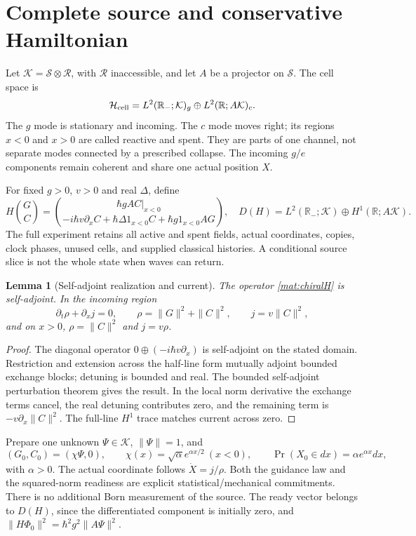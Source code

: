 \documentclass[11pt,oneside,openany]{book}
\newtheorem{lemma}[theorem]{Lemma}
\theoremstyle{definition}
\theoremstyle{remark}\newtheorem{remark}[theorem]{Remark}
\begin{document}
\section{Complete source and conservative Hamiltonian}

Let $\mathcal K=\mathcal S\otimes\mathcal R$, with $\mathcal R$ inaccessible, and let $A$ be a projector on $\mathcal S$. The cell space is
\begin{equation}
 \mathcal H_{\rm cell}=L^2(\mathbb R_-;\mathcal K)_g
            \oplus L^2(\mathbb R;A\mathcal K)_c.
 \label{mat:chiralspace}
\end{equation}
The $g$ mode is stationary and incoming. The $c$ mode moves right; its regions $x<0$ and $x>0$ are called reactive and spent. They are parts of one channel, not separate modes connected by a prescribed collapse. The incoming $g/e$ components remain coherent and share one actual position $X$.

For fixed $g>0$, $v>0$ and real $\Delta$, define
\begin{equation}
 H\binom GC=
 \binom{\hbar g A C|_{x<0}}
 {-i\hbar v\partial_x C+\hbar\Delta1_{x<0}C+\hbar g1_{x<0}AG},
 \quad D(H)=L^2(\mathbb R_-;\mathcal K)\oplus H^1(\mathbb R;A\mathcal K).
 \label{mat:chiralH}
\end{equation}
The full experiment retains all active and spent fields, actual coordinates, copies, clock phases, unused cells, and supplied classical histories. A conditional source slice is not the whole state when waves can return.

\begin{lemma}[Self-adjoint realization and current]
\label{mat:selfadjoint}
The operator \eqref{mat:chiralH} is self-adjoint. In the incoming region
\[
 \partial_t\rho+\partial_xj=0,
 \qquad\rho=\|G\|^2+\|C\|^2,\qquad j=v\|C\|^2,
\]
and on $x>0$, $\rho=\|C\|^2$ and $j=v\rho$.
\end{lemma}
\begin{proof}
The diagonal operator $0\oplus(-i\hbar v\partial_x)$ is self-adjoint on the stated domain. Restriction and extension across the half-line form mutually adjoint bounded exchange blocks; detuning is bounded and real. The bounded self-adjoint perturbation theorem gives the result. In the local norm derivative the exchange terms cancel, the real detuning contributes zero, and the remaining term is $-v\partial_x\|C\|^2$. The full-line $H^1$ trace matches current across zero.
\end{proof}

Prepare one unknown $\Psi\in\mathcal K$, $\|\Psi\|=1$, and
\begin{equation}
 (G_0,C_0)=(\chi\Psi,0),\qquad
 \chi(x)=\sqrt\alpha e^{\alpha x/2}\ (x<0),\qquad
 \Pr(X_0\in dx)=\alpha e^{\alpha x}dx,
 \label{mat:chiralready}
\end{equation}
with $\alpha>0$. The actual coordinate follows $\dot X=j/\rho$. Both the guidance law and the squared-norm readiness are explicit statistical/mechanical commitments. There is no additional Born measurement of the source. The ready vector belongs to $D(H)$, since the differentiated component is initially zero, and $\|H\Phi_0\|^2=\hbar^2g^2\|A\Psi\|^2$.
\end{document}
